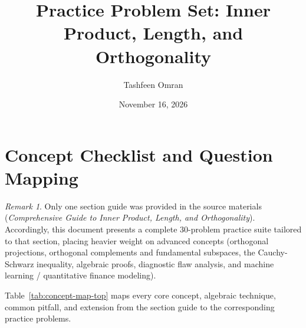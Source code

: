 \documentclass[11pt, letterpaper]{article}
\title{Practice Problem Set: Inner Product, Length, and Orthogonality}
\author{Tashfeen Omran}
\date{November 16, 2026}
\theoremstyle{definition}
\theoremstyle{remark}
\newtheorem{remark}{Remark}[section]
\begin{document}
\maketitle
\tableofcontents
\newpage

\section{Concept Checklist and Question Mapping}

\begin{remark}
Only one section guide was provided in the source materials (\textit{Comprehensive Guide to Inner Product, Length, and Orthogonality}). Accordingly, this document presents a complete $30$-problem practice suite tailored to that section, placing heavier weight on advanced concepts (orthogonal projections, orthogonal complements and fundamental subspaces, the Cauchy-Schwarz inequality, algebraic proofs, diagnostic flaw analysis, and machine learning / quantitative finance modeling).
\end{remark}

Table~\ref{tab:concept-map-top} maps every core concept, algebraic technique, common pitfall, and extension from the section guide to the corresponding practice problems.
\end{document}

